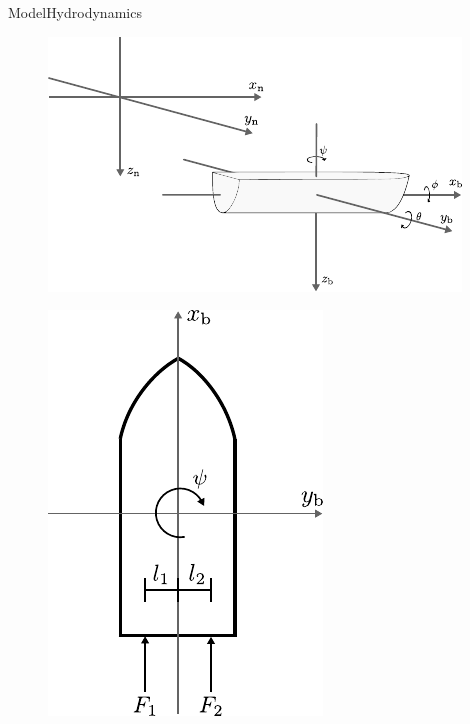 \begin{frame}{Model}{Hydrodynamics}
    \begin{minipage}{0.65\linewidth}
        \begin{figure}[H]
            \centering
            \includegraphics[width=1\linewidth]{figures/boat3D}
        \end{figure}        
    \end{minipage}\hfill      
    \begin{minipage}{0.3\linewidth}
        \begin{figure}[H]
            \centering
            \includegraphics[width=0.7\linewidth]{figures/boat2D}

\end{figure}
\end{minipage}
\end{frame}
